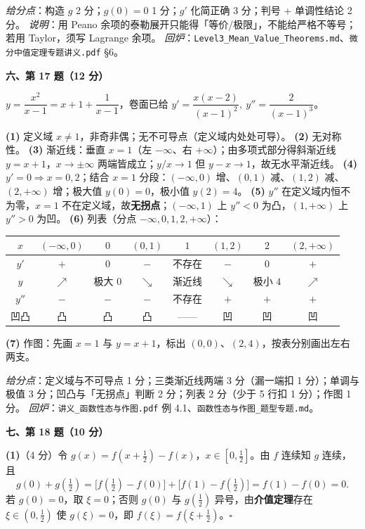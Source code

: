 \documentclass[11pt,a4paper]{ctexart}
\begin{document}
\noindent\textit{给分点}：构造 $g$ 2 分；$g(0)=0$ 1 分；$g'$ 化简正确 3 分；判号 + 单调性结论 2 分。
\textit{说明}：用 Peano 余项的泰勒展开只能得「等价/极限」，不能给严格不等号；若用 Taylor，须写 Lagrange 余项。
\textit{回炉}：\texttt{Level3\_Mean\_Value\_Theorems.md}、\texttt{微分中值定理专题讲义.pdf} §6。

\bigskip
\noindent\textbf{六、第 17 题（12 分）}

$y=\dfrac{x^2}{x-1}=x+1+\dfrac1{x-1}$，卷面已给 $y'=\dfrac{x(x-2)}{(x-1)^2},\ y''=\dfrac{2}{(x-1)^3}$。

\textbf{(1)} 定义域 $x\ne1$，非奇非偶；无不可导点（定义域内处处可导）。
\textbf{(2)} 无对称性。
\textbf{(3)} 渐近线：垂直 $x=1$（左 $-\infty$、右 $+\infty$）；由多项式部分得斜渐近线 $y=x+1$，$x\to\pm\infty$ 两端皆成立；$y/x\to1$ 但 $y-x\to1$，故无水平渐近线。
\textbf{(4)} $y'=0\Rightarrow x=0,2$；结合 $x=1$ 分段：$(-\infty,0)$ 增、$(0,1)$ 减、$(1,2)$ 减、$(2,+\infty)$ 增；极大值 $y(0)=0$，极小值 $y(2)=4$。
\textbf{(5)} $y''$ 在定义域内恒不为零，$x=1$ 不在定义域，故\textbf{无拐点}；$(-\infty,1)$ 上 $y''<0$ 为凸，$(1,+\infty)$ 上 $y''>0$ 为凹。
\textbf{(6)} 列表（分点 $-\infty,0,1,2,+\infty$）：
\begin{center}
\small\setlength{\tabcolsep}{4pt}
\begin{tabular}{c|ccccccc}
$x$ & $(-\infty,0)$ & $0$ & $(0,1)$ & $1$ & $(1,2)$ & $2$ & $(2,+\infty)$ \\
\hline
$y'$ & $+$ & $0$ & $-$ & 不存在 & $-$ & $0$ & $+$ \\
$y$ & $\nearrow$ & 极大 $0$ & $\searrow$ & 渐近线 & $\searrow$ & 极小 $4$ & $\nearrow$ \\
$y''$ & $-$ & $-$ & $-$ & 不存在 & $+$ & $+$ & $+$ \\
凹凸 & 凸 & 凸 & 凸 & —— & 凹 & 凹 & 凹 \\
\end{tabular}
\end{center}
\textbf{(7)} 作图：先画 $x=1$ 与 $y=x+1$，标出 $(0,0)$、$(2,4)$，按表分别画出左右两支。

\noindent\textit{给分点}：定义域与不可导点 1 分；三类渐近线两端 3 分（漏一端扣 1 分）；单调与极值 3 分；凹凸与「无拐点」判断 2 分；列表 2 分（少于 5 行扣 1 分）；作图 1 分。
\textit{回炉}：\texttt{讲义\_函数性态与作图.pdf} 例 4.1、\texttt{函数性态与作图\_题型专题.md}。

\bigskip
\noindent\textbf{七、第 18 题（10 分）}

\textbf{(1)}（4 分）令 $g(x)=f(x+\frac12)-f(x)$，$x\in[0,\frac12]$。由 $f$ 连续知 $g$ 连续，且
$$g(0)+g(\tfrac12)=\bigl[f(\tfrac12)-f(0)\bigr]+\bigl[f(1)-f(\tfrac12)\bigr]=f(1)-f(0)=0.$$
若 $g(0)=0$，取 $\xi=0$；否则 $g(0)$ 与 $g(\frac12)$ 异号，由\textbf{介值定理}存在 $\xi\in(0,\frac12)$ 使 $g(\xi)=0$，即 $f(\xi)=f(\xi+\frac12)$。\quad$\square$
\end{document}
